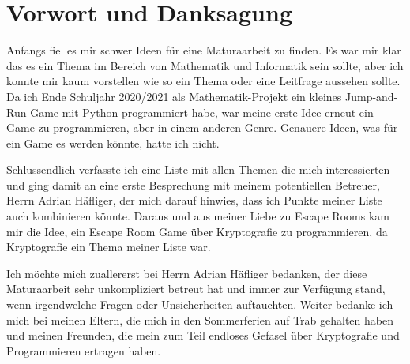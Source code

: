 \section{Vorwort und Danksagung}
\label{sec:vorwort}

Anfangs fiel es mir schwer Ideen für eine Maturaarbeit zu finden. Es war mir klar das es ein Thema im Bereich von Mathematik und Informatik sein sollte, aber ich konnte mir kaum vorstellen wie so ein Thema oder eine Leitfrage aussehen sollte. Da ich Ende Schuljahr 2020/2021 als Mathematik-Projekt ein kleines Jump-and-Run Game mit Python programmiert habe, war meine erste Idee erneut ein Game zu programmieren, aber in einem anderen Genre. Genauere Ideen, was für ein Game es werden könnte, hatte ich nicht.

Schlussendlich verfasste ich eine Liste mit allen Themen die mich interessierten und ging damit an eine erste Besprechung mit meinem potentiellen Betreuer, Herrn Adrian Häfliger, der mich darauf hinwies, dass ich Punkte meiner Liste auch kombinieren könnte. Daraus und aus meiner Liebe zu Escape Rooms kam mir die Idee, ein Escape Room Game über Kryptografie zu programmieren, da Kryptografie ein Thema meiner Liste war. 

Ich möchte mich zuallererst bei Herrn Adrian Häfliger bedanken, der diese Maturaarbeit sehr unkompliziert betreut hat und immer zur Verfügung stand, wenn irgendwelche Fragen oder Unsicherheiten auftauchten. Weiter bedanke ich mich bei meinen Eltern, die mich in den Sommerferien auf Trab gehalten haben und meinen Freunden, die mein zum Teil endloses Gefasel über Kryptografie und Programmieren ertragen haben.